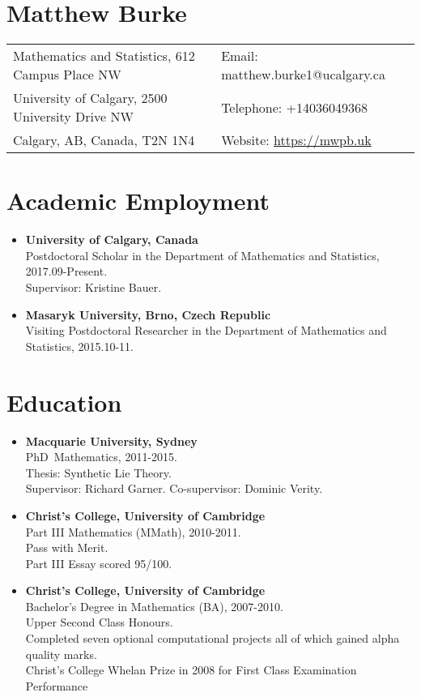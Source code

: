 \documentclass[10pt]{article}
\date{}
\begin{document}
\section*{\Huge Matthew Burke}
\begin{tabu}{@{}X[l6]X[r4]}
Mathematics and Statistics, 612 Campus Place NW & Email: matthew.burke1@ucalgary.ca \\
University of Calgary, 2500 University Drive NW & Telephone: +14036049368\\
Calgary, AB, Canada, T2N 1N4 & Website: \url{https://mwpb.uk}
\end{tabu}

\section*{Academic Employment}
\begin{itemize}
    \item {\bf University of Calgary, Canada}\\
    Postdoctoral Scholar in the Department of Mathematics and Statistics, 2017.09-Present.\\
        Supervisor: Kristine Bauer.
    \item {\bf Masaryk University, Brno, Czech Republic}\\
    Visiting Postdoctoral Researcher in the Department of Mathematics and Statistics, 2015.10-11.
\end{itemize}

\section*{Education}
\begin{itemize}
    \item {\bf Macquarie University, Sydney}\\
    PhD~Mathematics, 2011-2015.\\
    Thesis: Synthetic Lie Theory.\\
    Supervisor: Richard Garner. Co-supervisor: Dominic Verity.\\
    \item {\bf Christ's College, University of Cambridge}\\
    Part III Mathematics (MMath), 2010-2011.\\
    Pass with Merit.\\
    Part III Essay scored 95/100.\\
    \item {\bf Christ's College, University of Cambridge}\\
    Bachelor's Degree in Mathematics (BA), 2007-2010.\\
    Upper Second Class Honours.\\
    Completed seven optional computational projects all of which gained alpha quality marks.\\Christ's College Whelan Prize in 2008 for First Class Examination Performance
\end{itemize}
\end{document}
